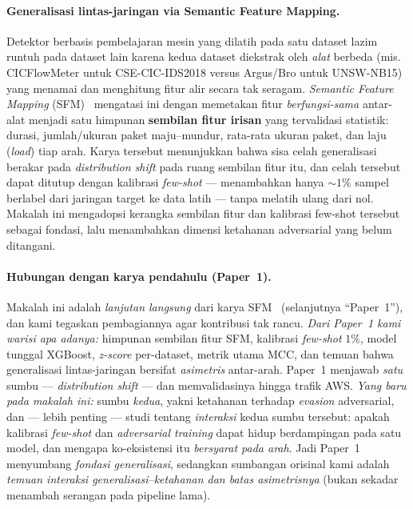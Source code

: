 \documentclass[11pt,a4paper]{article}
\begin{document}
\paragraph{Generalisasi lintas-jaringan via Semantic Feature Mapping.} Detektor
berbasis pembelajaran mesin yang dilatih pada satu dataset lazim runtuh pada dataset
lain karena kedua dataset diekstrak oleh \emph{alat} berbeda (mis. CICFlowMeter
untuk CSE-CIC-IDS2018 versus Argus/Bro untuk UNSW-NB15) yang menamai dan
menghitung fitur alir secara tak seragam. \emph{Semantic Feature Mapping}
(SFM)~\cite{martono2024sfm} mengatasi ini dengan memetakan fitur \emph{berfungsi-sama}
antar-alat menjadi satu himpunan \textbf{sembilan fitur irisan} yang tervalidasi
statistik: durasi, jumlah/ukuran paket maju--mundur, rata-rata ukuran paket, dan
laju (\emph{load}) tiap arah. Karya tersebut menunjukkan bahwa sisa celah
generalisasi berakar pada \emph{distribution shift} pada ruang sembilan fitur itu,
dan celah tersebut dapat ditutup dengan kalibrasi \emph{few-shot} --- menambahkan
hanya $\sim 1\%$ sampel berlabel dari jaringan target ke data latih --- tanpa
melatih ulang dari nol. Makalah ini mengadopsi kerangka sembilan fitur dan kalibrasi
few-shot tersebut sebagai fondasi, lalu menambahkan dimensi ketahanan adversarial
yang belum ditangani.

\paragraph{Hubungan dengan karya pendahulu (Paper~1).} Makalah ini adalah
\emph{lanjutan langsung} dari karya SFM~\cite{martono2024sfm} (selanjutnya
``Paper~1''), dan kami tegaskan pembagiannya agar kontribusi tak rancu. \emph{Dari
Paper~1 kami warisi apa adanya:} himpunan sembilan fitur SFM, kalibrasi
\emph{few-shot} $1\%$, model tunggal XGBoost, \emph{z-score} per-dataset, metrik
utama MCC, dan temuan bahwa generalisasi lintas-jaringan bersifat \emph{asimetris}
antar-arah. Paper~1 menjawab \emph{satu} sumbu --- \emph{distribution shift} --- dan
memvalidasinya hingga trafik AWS. \emph{Yang baru pada makalah ini:} sumbu
\emph{kedua}, yakni ketahanan terhadap \emph{evasion} adversarial, dan --- lebih
penting --- studi tentang \emph{interaksi} kedua sumbu tersebut: apakah kalibrasi
\emph{few-shot} dan \emph{adversarial training} dapat hidup berdampingan pada satu
model, dan mengapa ko-eksistensi itu \emph{bersyarat pada arah}. Jadi Paper~1
menyumbang \emph{fondasi generalisasi}, sedangkan sumbangan orisinal kami adalah
\emph{temuan interaksi generalisasi--ketahanan dan batas asimetrisnya} (bukan
sekadar menambah serangan pada pipeline lama).
\end{document}
